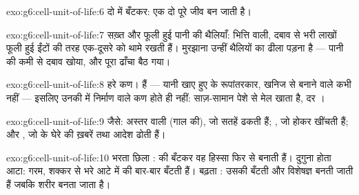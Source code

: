 \begin{solution}{exo:g6:cell-unit-of-life:6}
दो में बँटकर: एक  दो पूरे जीव बन जाती है।
\end{solution}

\begin{solution}{exo:g6:cell-unit-of-life:7}
सख़्त  और फूली हुई पानी की थैलियाँ: भित्ति वाली, दबाव से
भरी लाखों  फूली हुई ईंटों की तरह एक-दूसरे को थामे रखती हैं।
मुरझाना उन्हीं थैलियों का ढीला पड़ना है --- पानी की कमी से दबाव खोया, और
पूरा ढाँचा बैठ गया।
\end{solution}

\begin{solution}{exo:g6:cell-unit-of-life:8}
हरे कण।   हैं --- यानी खाए हुए  के
रूपांतरकार, खनिज से बनाने वाले कभी नहीं --- इसलिए उनकी  में
निर्माण वाले कण होते ही नहीं: साज़-सामान पेशे से मेल खाता है,  दर
।
\end{solution}

\begin{solution}{exo:g6:cell-unit-of-life:9}
जैसे: अस्तर वाली  (गाल की), जो सतहें ढकती हैं;  ,
जो  होकर  खींचती हैं; और  , जो 
के घेरे की ख़बरें तथा आदेश ढोती हैं।
\end{solution}

\begin{solution}{exo:g6:cell-unit-of-life:10}
भरता छिला :  की  बँटकर वह हिस्सा फिर से बनाती हैं।
दुगुना होता आटा: गरम, शक्कर से भरे आटे में  की  बार-बार
बँटती हैं। बढ़ता : उसकी  बँटती और विशेषज्ञ बनती जाती हैं
जबकि शरीर बनता जाता है।
\end{solution}

